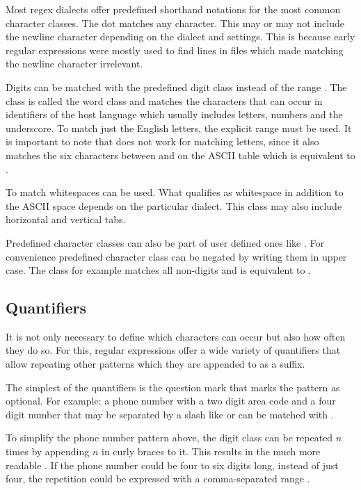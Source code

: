 Most regex dialects offer predefined shorthand notations for the most common character classes. The dot  matches any character. This may or may not include the newline character depending on the dialect and settings. This is because early regular expressions were mostly used to find lines in files which made matching the newline character irrelevant. 

Digits can be matched with the predefined digit class  instead of the range \pattern{[0-9]}. The class  is called the word class and matches the characters that can occur in identifiers of the host language which usually includes letters, numbers and the underscore. To match just the English letters, the explicit range \pattern{[a-zA-Z]} must be used. It is important to note that  does not work for matching letters, since it also matches the six characters between  and  on the ASCII table which is equivalent to \pattern{[A-Za-z[\\]\caret\_`]}.

To match whitespaces  can be used. What qualifies as whitespace in addition to the ASCII space \inp{ } depends on the particular dialect. This class may also include horizontal and vertical tabs.

Predefined character classes can also be part of user defined ones like \pattern{[A-Za-z\bs d]}. For convenience predefined character class can be negated by writing them in upper case. The class  for example matches all non-digits and is equivalent to \pattern{[\caret \bs d]}.

\subsection{Quantifiers} \label{sec:introQuantifiers}

It is not only necessary to define which characters can occur but also how often they do so. For this, regular expressions offer a wide variety of quantifiers that allow repeating other patterns which they are appended to as a suffix.

The simplest of the quantifiers is the question mark  that marks the pattern as optional. For example: a phone number with a two digit area code and a four digit number that may be separated by a slash like  or  can be matched with .

To simplify the phone number pattern above, the digit class  can be repeated $n$ times by appending $n$ in curly braces to it. This results in the much more readable . If the phone number could be four to six digits long, instead of just four, the repetition could be expressed with a comma-separated range . 

